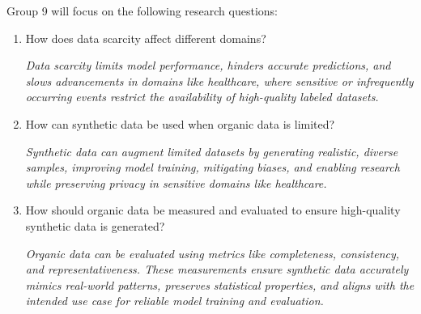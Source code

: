 \documentclass[sigplan,screen]{acmart}
\begin{document}
Group 9 will focus on the following research questions:
\begin{enumerate}
    \item How does data scarcity affect different domains? 
    \begin{itemize}
\textit{Data scarcity limits model performance, hinders accurate predictions, and slows advancements in domains like healthcare, where sensitive or infrequently occurring events restrict the availability of high-quality labeled datasets.}
    \end{itemize}

    \item How can synthetic data be used when organic data is limited?
    \begin{itemize}
\textit{Synthetic data can augment limited datasets by generating realistic, diverse samples, improving model training, mitigating biases, and enabling research while preserving privacy in sensitive domains like healthcare.}
    \end{itemize}

    \item How should organic data be measured and evaluated to ensure high-quality synthetic data is generated? 
    \begin{itemize}
\textit{Organic data can be evaluated using metrics like completeness, consistency, and representativeness. These measurements ensure synthetic data accurately mimics real-world patterns, preserves statistical properties, and aligns with the intended use case for reliable model training and evaluation.}
    \end{itemize}
\end{enumerate}
\end{document}
